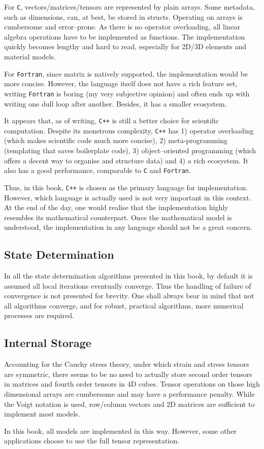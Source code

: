 For \texttt{C}, vectors/matrices/tensors are represented by plain arrays.
Some metadata, such as dimensions, can, at best, be stored in structs.
Operating on arrays is cumbersome and error--prone.
As there is no operator overloading, all linear algebra operations have to be implemented as functions.
The implementation quickly becomes lengthy and hard to read, especially for 2D/3D elements and material models.

For \texttt{Fortran}, since matrix is natively supported, the implementation would be more concise.
However, the language itself does not have a rich feature set, writing \texttt{Fortran} is boring (my very subjective opinion) and often ends up with writing one dull loop after another.
Besides, it has a smaller ecosystem.

It appears that, as of writing, \texttt{C++} is still a better choice for scientific computation.
Despite its monstrous complexity, \texttt{C++} has 1) operator overloading (which makes scientific code much more concise), 2) meta-programming (templating that saves boilerplate code), 3) object--oriented programming (which offers a decent way to organise and structure data) and 4) a rich ecosystem.
It also has a good performance, comparable to \texttt{C} and \texttt{Fortran}.

Thus, in this book, \texttt{C++} is chosen as the primary language for implementation.
However, which language is actually used is not very important in this context.
At the end of the day, one would realise that the implementation highly resembles its mathematical counterpart.
Once the mathematical model is understood, the implementation in any language should not be a great concern.
\subsection{State Determination}
In all the state determination algorithms presented in this book, by default it is assumed all local iterations eventually converge.
Thus the handling of failure of convergence is not presented for brevity.
One shall always bear in mind that not all algorithms converge, and for robust, practical algorithms, more numerical processes are required.
\subsection{Internal Storage}
Accounting for the Cauchy stress theory, under which strain and stress tensors are symmetric, there seems to be no need to actually store second order tensors in matrices and fourth order tensors in 4D cubes.
Tensor operations on those high dimensional arrays are cumbersome and may have a performance penalty.
While the Voigt notation is used, row/column vectors and 2D matrices are sufficient to implement most models.

In this book, all models are implemented in this way.
However, some other applications choose to use the full tensor representation.